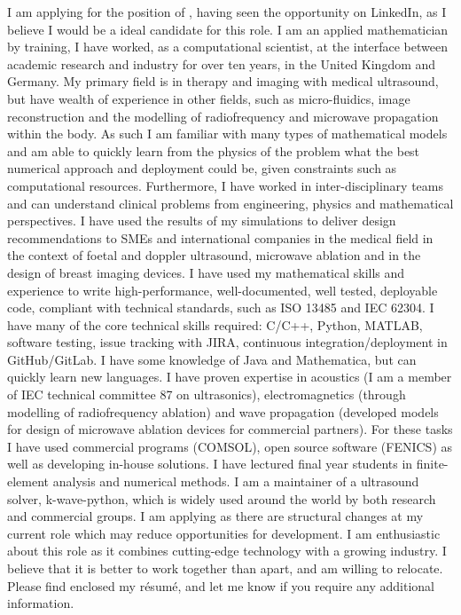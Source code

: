 \documentclass[10pt, a4paper, sans]{moderncv}
\begin{document}
%

%
\vfill %
%
I am applying for the position of , having seen the opportunity on LinkedIn, as I believe I would be a ideal candidate for this role. 
%
\vfill
%
I am an applied mathematician by training, I have worked, as a computational scientist, at the interface between academic research and industry for over ten years, in the United Kingdom and Germany. My  primary field is in therapy and imaging with medical ultrasound, but have wealth of experience in other fields, such as micro-fluidics, image reconstruction and the modelling of radiofrequency and microwave propagation within the body. As such I am familiar with many types of mathematical models and am able to quickly learn from the physics of the problem what the best numerical approach and deployment could be, given constraints such as computational resources.
%
\vfill
%
Furthermore, I have worked in inter-disciplinary teams and can understand clinical problems from engineering, physics and mathematical perspectives. I have used the results of my simulations to deliver design recommendations to SMEs and international companies in the medical field in the context of foetal and doppler ultrasound, microwave ablation and in the design of breast imaging devices. 
%
\vfill
%
I have used my mathematical skills and experience to write high-performance, well-documented, well tested, deployable code, compliant with technical standards, such as ISO 13485 and IEC 62304. I have many of the core technical skills required: C/C++, Python, MATLAB, software testing, issue tracking with JIRA, continuous integration/deployment in GitHub/GitLab. I have some knowledge of Java and Mathematica, but can quickly learn new languages.
%
\vfill
%
I have proven expertise in acoustics (I am a member of IEC technical committee 87 on ultrasonics), electromagnetics (through modelling of radiofrequency ablation) and wave propagation (developed models for design of microwave ablation devices for commercial partners). For these tasks I have used commercial programs (COMSOL), open source software (FENICS) as well as developing in-house solutions. I have lectured final year students in finite-element analysis and numerical methods. I am a maintainer of a ultrasound solver, k-wave-python, which is widely used around the world by both research and commercial groups. 
%
\vfill
%
I am applying as there are structural changes at my current role which may reduce opportunities for development. I am enthusiastic about this role as it combines cutting-edge technology with a growing industry. I believe that it is better to work together than apart, and am willing to relocate. 
%
\vfill %
Please find enclosed my r\'{e}sum\'{e}, and let me know if you require any additional information.
%
\vfill
\makeletterclosing
\vfill
\end{document}
